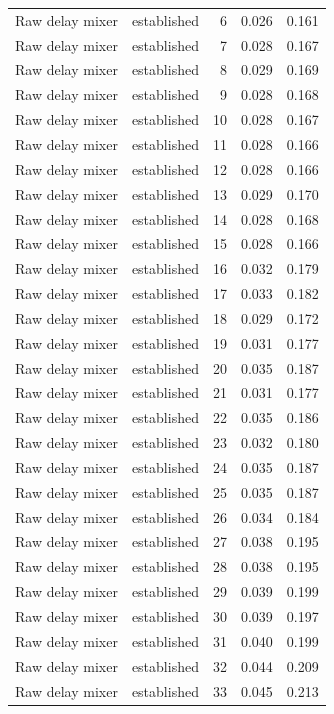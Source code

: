\begin{tabular}{llrrr}
Raw delay mixer & established & 6 & 0.026 & 0.161 \\
Raw delay mixer & established & 7 & 0.028 & 0.167 \\
Raw delay mixer & established & 8 & 0.029 & 0.169 \\
Raw delay mixer & established & 9 & 0.028 & 0.168 \\
Raw delay mixer & established & 10 & 0.028 & 0.167 \\
Raw delay mixer & established & 11 & 0.028 & 0.166 \\
Raw delay mixer & established & 12 & 0.028 & 0.166 \\
Raw delay mixer & established & 13 & 0.029 & 0.170 \\
Raw delay mixer & established & 14 & 0.028 & 0.168 \\
Raw delay mixer & established & 15 & 0.028 & 0.166 \\
Raw delay mixer & established & 16 & 0.032 & 0.179 \\
Raw delay mixer & established & 17 & 0.033 & 0.182 \\
Raw delay mixer & established & 18 & 0.029 & 0.172 \\
Raw delay mixer & established & 19 & 0.031 & 0.177 \\
Raw delay mixer & established & 20 & 0.035 & 0.187 \\
Raw delay mixer & established & 21 & 0.031 & 0.177 \\
Raw delay mixer & established & 22 & 0.035 & 0.186 \\
Raw delay mixer & established & 23 & 0.032 & 0.180 \\
Raw delay mixer & established & 24 & 0.035 & 0.187 \\
Raw delay mixer & established & 25 & 0.035 & 0.187 \\
Raw delay mixer & established & 26 & 0.034 & 0.184 \\
Raw delay mixer & established & 27 & 0.038 & 0.195 \\
Raw delay mixer & established & 28 & 0.038 & 0.195 \\
Raw delay mixer & established & 29 & 0.039 & 0.199 \\
Raw delay mixer & established & 30 & 0.039 & 0.197 \\
Raw delay mixer & established & 31 & 0.040 & 0.199 \\
Raw delay mixer & established & 32 & 0.044 & 0.209 \\
Raw delay mixer & established & 33 & 0.045 & 0.213 \\

\end{tabular}
